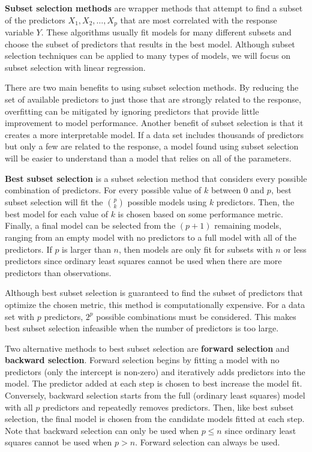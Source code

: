 \documentclass{article}
\begin{document}
\textbf{Subset selection methods} are wrapper methods that attempt to find a subset of the predictors $X_1, X_2, \dotsc, X_p$ that are most correlated with the response variable $Y$. These algorithms usually fit models for many different subsets and choose the subset of predictors that results in the best model. Although subset selection techniques can be applied to many types of models, we will focus on subset selection with linear regression.

There are two main benefits to using subset selection methods. By reducing the set of available predictors to just those that are strongly related to the response, overfitting can be mitigated by ignoring predictors that provide little improvement to model performance. Another benefit of subset selection is that it creates a more interpretable model. If a data set includes thousands of predictors but only a few are related to the response, a model found using subset selection will be easier to understand than a model that relies on all of the parameters. 

\textbf{Best subset selection} is a subset selection method that considers every possible combination of predictors. For every possible value of $k$ between 0 and $p$, best subset selection will fit the ${p\choose k}$ possible models using $k$ predictors. Then, the best model for each value of $k$ is chosen based on some performance metric. Finally, a final model can be selected from the $(p + 1)$ remaining models, ranging from an empty model with no predictors to a full model with all of the predictors. If $p$ is larger than $n$, then models are only fit for subsets with $n$ or less predictors since ordinary least squares cannot be used when there are more predictors than observations.

Although best subset selection is guaranteed to find the subset of predictors that optimize the chosen metric, this method is computationally expensive. For a data set with $p$ predictors, $2^p$ possible combinations must be considered. This makes best subset selection infeasible when the number of predictors is too large.

Two alternative methods to best subset selection are \textbf{forward selection} and \textbf{backward selection}. Forward selection begins by fitting a model with no predictors (only the intercept is non-zero) and iteratively adds predictors into the model. The predictor added at each step is chosen to best increase the model fit. Conversely, backward selection starts from the full (ordinary least squares) model with all $p$ predictors and repeatedly removes predictors. Then, like best subset selection, the final model is chosen from the candidate models fitted at each step. Note that backward selection can only be used when $p\leq n$ since ordinary least squares cannot be used when $p>n$. Forward selection can always be used.
\end{document}

